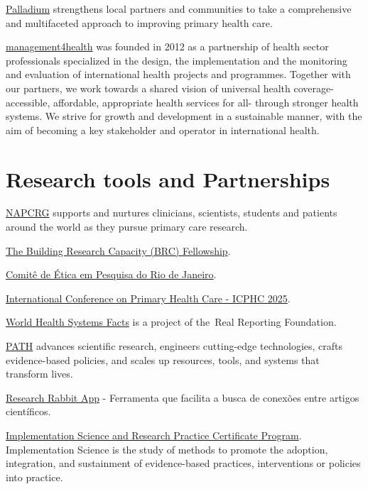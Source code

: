 \documentclass[
  letterpaper,
  DIV=11,
  numbers=noendperiod]{scrreprt}
\begin{document}
\href{https://thepalladiumgroup.com/areas-expertise/health}{Palladium}
strengthens local partners and communities to take a comprehensive and
multifaceted approach to improving primary health care.

\href{https://m4health.pro/about-us/}{management4health} was founded in
2012 as a partnership of health sector professionals specialized in the
design, the implementation and the monitoring and evaluation of
international health projects and programmes. Together with our
partners, we work towards a shared vision of universal health coverage-
accessible, affordable, appropriate health services for all- through
stronger health systems. We strive for growth and development in a
sustainable manner, with the aim of becoming a key stakeholder and
operator in international health.


\chapter{Research tools and
Partnerships}\label{research-tools-and-partnerships}

\href{https://www.napcrg.org/}{NAPCRG} supports and nurtures clinicians,
scientists, students and patients around the world as they pursue
primary care research.

\href{https://www.adfm.org/programs/brc-fellowship/}{The Building
Research Capacity (BRC) Fellowship}.

\href{https://saude.prefeitura.rio/comite-de-etica-em-pesquisa/}{Comitê
de Ética em Pesquisa do Rio de Janeiro}.

\href{https://icphc.iphce.org/}{International Conference on Primary
Health Care - ICPHC 2025}.

\href{https://healthsystemsfacts.org/?_gl=1\%2A1aq2uve\%2A_up\%2AMQ..\%2A_ga\%2AMTUxMzYxNjc4OS4xNzUwNDcxMTI2\%2A_ga_SDY74B5S30\%2AczE3NTA0NzExMjQkbzEkZzAkdDE3NTA0NzExMjQkajYwJGwwJGgw}{World
Health Systems Facts} is a project of the~Real Reporting Foundation.

\href{https://www.path.org/what-we-do/}{PATH} advances scientific
research, engineers cutting-edge technologies, crafts evidence-based
policies, and scales up resources, tools, and systems that transform
lives.

\href{https://researchrabbitapp.com/}{Research Rabbit App} - Ferramenta
que facilita a busca de conexões entre artigos científicos.

\href{https://publichealth.jhu.edu/academics/implementation-science-and-research-practice-certificate-program}{Implementation
Science and Research Practice Certificate Program}. Implementation
Science is the study of methods to promote the adoption, integration,
and sustainment of evidence-based practices, interventions or policies
into practice.
\end{document}
